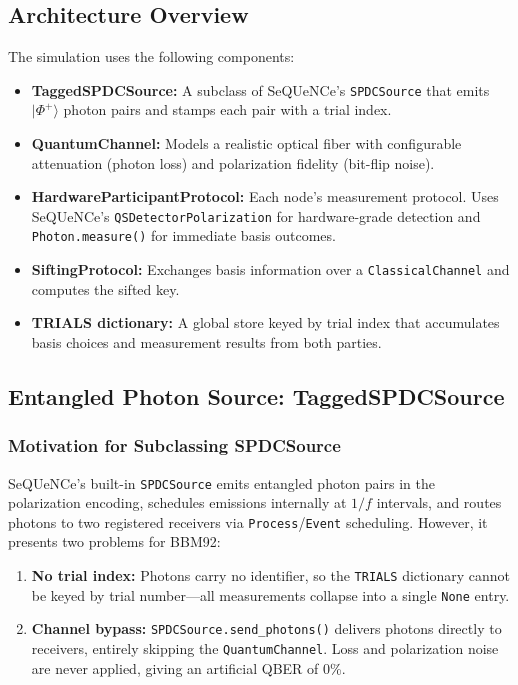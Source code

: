 \documentclass[12pt,oneside,letterpaper,english]{article}
\begin{document}
\subsection{Architecture Overview}

The simulation uses the following components:

\begin{itemize}
    \item \textbf{TaggedSPDCSource:} A subclass of SeQUeNCe's \texttt{SPDCSource} that emits $|\Phi^+\rangle$ photon pairs and stamps each pair with a trial index.
    \item \textbf{QuantumChannel:} Models a realistic optical fiber with configurable attenuation (photon loss) and polarization fidelity (bit-flip noise).
    \item \textbf{HardwareParticipantProtocol:} Each node's measurement protocol. Uses SeQUeNCe's \texttt{QSDetectorPolarization} for hardware-grade detection and \texttt{Photon.measure()} for immediate basis outcomes.
    \item \textbf{SiftingProtocol:} Exchanges basis information over a \texttt{ClassicalChannel} and computes the sifted key.
    \item \textbf{TRIALS dictionary:} A global store keyed by trial index that accumulates basis choices and measurement results from both parties.
\end{itemize}

\subsection{Entangled Photon Source: TaggedSPDCSource}

\subsubsection{Motivation for Subclassing SPDCSource}

SeQUeNCe's built-in \texttt{SPDCSource} emits entangled photon pairs in the polarization encoding, schedules emissions internally at $1/f$ intervals, and routes photons to two registered receivers via \texttt{Process}/\texttt{Event} scheduling. However, it presents two problems for BBM92:

\begin{enumerate}
    \item \textbf{No trial index:} Photons carry no identifier, so the \texttt{TRIALS} dictionary cannot be keyed by trial number---all measurements collapse into a single \texttt{None} entry.
    \item \textbf{Channel bypass:} \texttt{SPDCSource.send\_photons()} delivers photons directly to receivers, entirely skipping the \texttt{QuantumChannel}. Loss and polarization noise are never applied, giving an artificial QBER of 0\%.
\end{enumerate}
\end{document}
